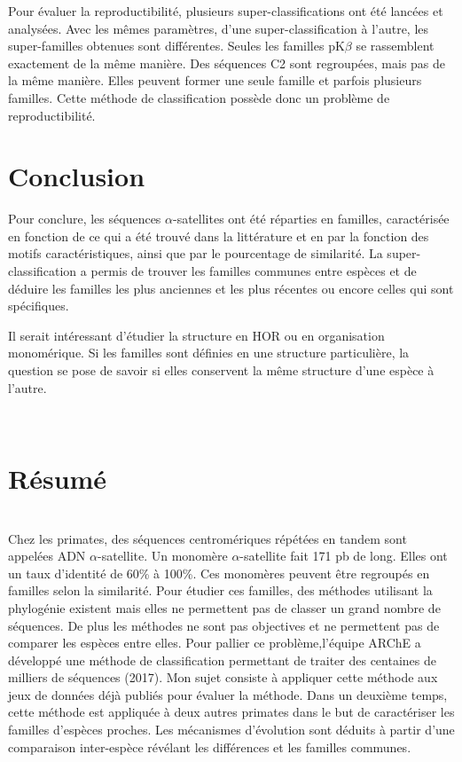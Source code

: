 \documentclass[12pt,a4paper]{article}
\begin{document}
	Pour évaluer la reproductibilité,  plusieurs super-classifications ont été lancées et analysées. Avec les mêmes paramètres, d'une super-classification à l'autre, les super-familles obtenues sont différentes. Seules les familles pK$\beta$ se rassemblent exactement de la même manière. Des séquences C2 sont regroupées, mais pas de la même manière. Elles peuvent former une seule famille et parfois plusieurs familles. Cette méthode de classification possède donc un problème de reproductibilité.  
	
\section{Conclusion}
	Pour conclure, les séquences  $\alpha$-satellites ont été réparties en familles, caractérisée en fonction de ce qui a été trouvé dans la littérature et en par la fonction des motifs caractéristiques, ainsi que par le pourcentage de similarité.  La super-classification a permis de trouver les familles communes entre espèces et de déduire les familles les plus anciennes et les plus récentes ou encore celles qui sont spécifiques.
	
	Il serait intéressant d'étudier la structure en HOR ou en organisation monomérique. Si les familles sont définies en une structure particulière, la question se pose de savoir si elles conservent la même structure d'une espèce à l'autre.

\newpage
\strut  ~  \mbox{}  \null
\newpage



\newpage 
\thispagestyle{empty}
\section*{Résumé}~\\[0.2cm]
Chez les primates, des séquences centromériques répétées en tandem sont appelées ADN $\alpha$-satellite. Un monomère $\alpha$-satellite fait 171 pb de long. Elles ont un taux d'identité de 60\% à 100\%. Ces monomères peuvent être regroupés en familles selon la similarité. Pour étudier ces familles, des méthodes utilisant la phylogénie existent mais elles ne permettent pas de classer un grand nombre de séquences. De plus les méthodes ne sont pas objectives et ne permettent pas de comparer les espèces entre elles. Pour pallier ce problème,l'équipe ARChE a développé une méthode de classification permettant de traiter des centaines de milliers de séquences (2017). Mon sujet consiste à appliquer cette méthode aux jeux de données déjà publiés pour évaluer la méthode. Dans un deuxième temps, cette méthode est appliquée à deux autres primates dans le but de  caractériser les familles d'espèces proches. Les mécanismes d'évolution sont déduits à partir d'une comparaison inter-espèce révélant les différences et les familles communes. 
\end{document}

